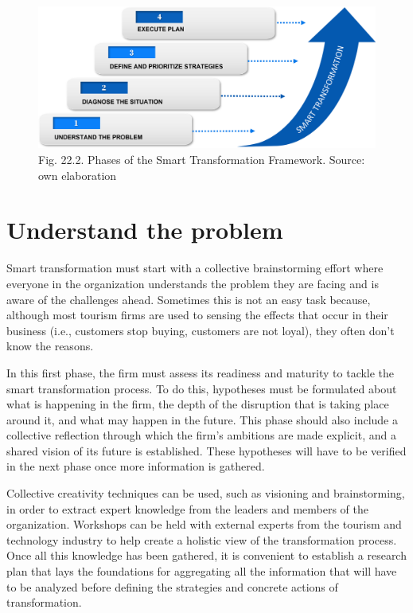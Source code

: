 \documentclass[
  letterpaper,
  DIV=11,
  numbers=noendperiod]{scrreprt}
\begin{document}
\begin{figure}

{\centering \includegraphics{img/fig36.png}

}

\caption{Fig. 22.2. Phases of the Smart Transformation Framework.
Source: own elaboration}

\end{figure}

\hypertarget{understand-the-problem}{%
\section{Understand the problem}\label{understand-the-problem}}

Smart transformation must start with a collective brainstorming effort
where everyone in the organization understands the problem they are
facing and is aware of the challenges ahead. Sometimes this is not an
easy task because, although most tourism firms are used to sensing the
effects that occur in their business (i.e., customers stop buying,
customers are not loyal), they often don't know the reasons.

In this first phase, the firm must assess its readiness and maturity to
tackle the smart transformation process. To do this, hypotheses must be
formulated about what is happening in the firm, the depth of the
disruption that is taking place around it, and what may happen in the
future. This phase should also include a collective reflection through
which the firm's ambitions are made explicit, and a shared vision of its
future is established. These hypotheses will have to be verified in the
next phase once more information is gathered.

Collective creativity techniques can be used, such as visioning and
brainstorming, in order to extract expert knowledge from the leaders and
members of the organization. Workshops can be held with external experts
from the tourism and technology industry to help create a holistic view
of the transformation process. Once all this knowledge has been
gathered, it is convenient to establish a research plan that lays the
foundations for aggregating all the information that will have to be
analyzed before defining the strategies and concrete actions of
transformation.
\end{document}
